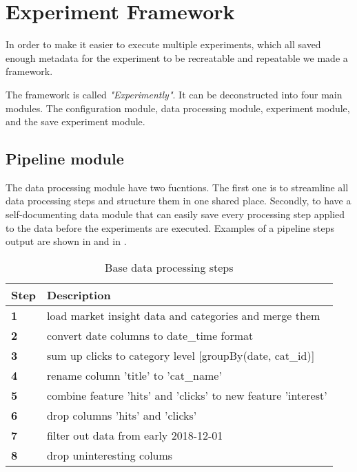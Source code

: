 \section{Experiment Framework}
\label{section:method:experiment-framework}
In order to make it easier to execute multiple experiments, which all saved
enough metadata for the experiment to be recreatable and repeatable we made
a framework.

The framework is called \textit{"Experimently"}. It can be deconstructed into
four main modules. The configuration module, data processing module, experiment module, and the save experiment module.


\subsection{Pipeline module}
\label{section:Method:Pipeline}
The data processing module have two fucntions.
The first one is to streamline all data processing steps and structure them in one shared place.
Secondly, to have a self-documenting data module that can easily save
every processing step applied to the data before the experiments are executed.
Examples of a pipeline steps output are shown in 
and in .

\begin{table}[h]
  \caption{Base data processing steps}
  \label{table:base_data_processing_steps}
  \begin{tabular}{ll}
    \toprule
    Step       & Description                                                   \\
    \midrule
    \textbf{1} & load market insight data and categories and merge them        \\
    \textbf{2} & convert date columns to date\_time format                     \\
    \textbf{3} & sum up clicks to category level [groupBy(date, cat\_id)]      \\
    \textbf{4} & rename column 'title' to 'cat\_name'                          \\
    \textbf{5} & combine feature 'hits' and 'clicks' to new feature 'interest' \\
    \textbf{6} & drop columns 'hits' and 'clicks'                              \\
    \textbf{7} & filter out data from early 2018-12-01                         \\
    \textbf{8} & drop uninteresting colums                                     \\
    \bottomrule
  \end{tabular}
\end{table}

